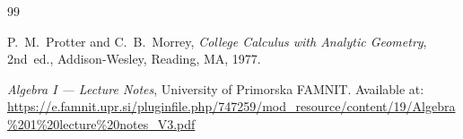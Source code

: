 \documentclass[11pt,a4paper]{article}
\theoremstyle{plain}
\theoremstyle{definition}
\theoremstyle{remark}
\begin{document}
\newpage

\begin{thebibliography}{99}
\sloppy

P.~M.~Protter and C.~B.~Morrey,
\textit{College Calculus with Analytic Geometry},
2nd~ed., Addison-Wesley, Reading, MA, 1977.

\textit{Algebra I --- Lecture Notes},
University of Primorska FAMNIT\@.
Available at: \url{https://e.famnit.upr.si/pluginfile.php/747259/mod_resource/content/19/Algebra%201%20lecture%20notes_V3.pdf}

\end{thebibliography}
\end{document}
